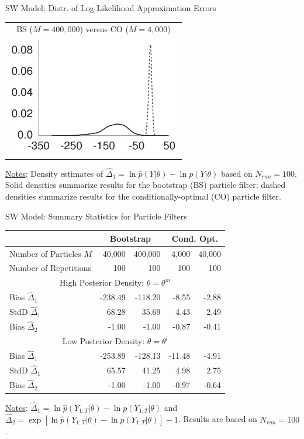 \documentclass[presentation]{beamer}
\begin{document}
\begin{frame}[label={sec:org171426d}]{SW Model: Distr. of Log-Likelihood Approximation Errors}
\begin{center}
	\begin{tabular}{c}
		BS ($M=400,000$) versus CO ($M=4,000$) \\
		\includegraphics[width=3in]{sw_me_paramax_bs_lnlhbias.pdf}
	\end{tabular}
\end{center}
\uline{Notes}: Density estimates of \(\hat{\Delta}_1 = \ln \hat{p}(Y|\theta)- \ln p(Y|\theta)\) based on \(N_{run}=100\).
Solid densities summarize results for the bootstrap (BS) particle filter;
dashed densities summarize results for the conditionally-optimal (CO) particle filter.
\end{frame}


\begin{frame}[label={sec:org709dc80}]{SW Model: Summary Statistics for Particle Filters}
\begin{center}
	\begin{tabular}{lrrrr} \\ \hline \hline
		& \multicolumn{2}{c}{Bootstrap} & \multicolumn{2}{c}{Cond. Opt.} \\ \hline
		Number of Particles $M$ & 40,000 & 400,000 & 4,000 & 40,000 \\
		Number of Repetitions   & 100 & 100 & 100 & 100 \\ \hline
		\multicolumn{5}{c}{High Posterior Density: $\theta = \theta^m$} \\ \hline
		Bias $\hat{\Delta}_1$ & -238.49 & -118.20 &   -8.55 &   -2.88 \\
		StdD $\hat{\Delta}_1$ &   68.28 &   35.69 &    4.43 &    2.49 \\
		Bias $\hat{\Delta}_2$ &   -1.00 &   -1.00 &   -0.87 &   -0.41 \\ \hline
		\multicolumn{5}{c}{Low Posterior Density: $\theta = \theta^l$} \\ \hline
		Bias $\hat{\Delta}_1$ & -253.89 & -128.13 &  -11.48 &   -4.91 \\
		StdD $\hat{\Delta}_1$ &   65.57 &   41.25 &    4.98 &    2.75 \\
		Bias $\hat{\Delta}_2$ &   -1.00 &   -1.00 &   -0.97 &   -0.64 \\ \hline
	\end{tabular}
\end{center}
\uline{Notes}: \(\hat{\Delta}_1 = \ln \hat{p}(Y_{1:T}|\theta) - \ln p(Y_{1:T}|\theta)\)
and \(\hat{\Delta}_2 = \exp[ \ln \hat{p}(Y_{1:T}|\theta) - \ln
	p(Y_{1:T}|\theta) ] - 1\). Results are based on \(N_{run}=100\). 
\end{frame}
\end{document}
